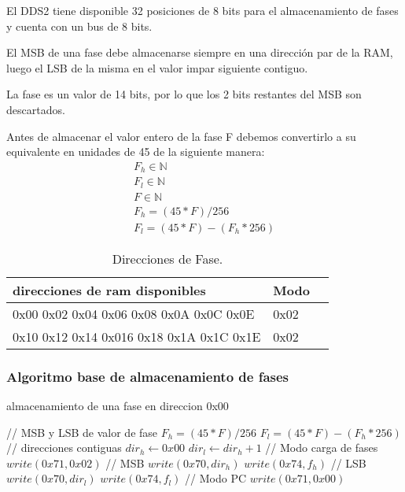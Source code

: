El DDS2 tiene disponible 32 posiciones de 8 bits para el almacenamiento de fases
y cuenta con un bus de 8 bits.

El MSB de una fase debe almacenarse siempre en una direcci\'on par de la RAM, luego
el LSB de la misma en el valor impar siguiente contiguo.

La fase es un valor de 14 bits, por lo que los 2 bits restantes del MSB son descartados.

Antes de almacenar el valor entero de la fase F debemos convertirlo a su equivalente
en unidades de 45 de la siguiente manera:
\begin{gather}
        F_h \in \mathbb{N} \\
        F_l \in \mathbb{N} \\
        F \in \mathbb{N} \\
        F_h = (45 * F) / 256 \\          
        F_l = (45 * F) - (F_h * 256)
\end{gather}

\begin{table}[ht]
    \centering
    \begin{tabular}{|l|l|l|}
    \hline
    direcciones de ram disponibles           & Modo \\
    \hline
    0x00 0x02 0x04 0x06 0x08 0x0A 0x0C 0x0E  & 0x02 \\
    \hline
    0x10 0x12 0x14 0x016 0x18 0x1A 0x1C 0x1E & 0x02 \\
    \hline
\end{tabular}
\caption{\label{tab:tableTestCases}Direcciones de Fase.}
\end{table}

\subsubsection{Algoritmo base de almacenamiento de fases}
\begin{algorithm}[H]
    \caption{almacenamiento de una fase en direccion 0x00}\label{algo_phases}
    \begin{algorithmic}[1]
    \State // {MSB y LSB de valor de fase}
    \State $F_h = (45 * F) / 256$         
    \State $F_l = (45 * F) - (F_h * 256)$
    \State // {direcciones contiguas}
    \State $dir_h \gets 0x00$
    \State $dir_l \gets dir_h + 1$
    \State // {Modo carga de fases}
    \State $write(0x71, 0x02)$
    \State // {MSB}
    \State $write(0x70, dir_h)$ 
    \State $write(0x74, f_h)$
    \State // {LSB}
    \State $write(0x70, dir_l)$
    \State $write(0x74, f_l)$
    \State // {Modo PC}
    \State $write(0x71, 0x00)$
    \EndProcedure
    \end{algorithmic}
\end{algorithm}

